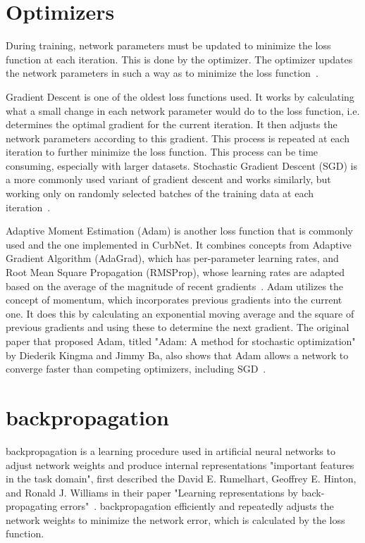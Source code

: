 \section{Optimizers}\label{section:background-optimizers}
During training, network parameters must be updated to minimize the loss function at each iteration.
This is done by the optimizer.
The optimizer updates the network parameters in such a way as to minimize the loss function~\cite{optimizer-intro}.

Gradient Descent is one of the oldest loss functions used.
It works by calculating what a small change in each network parameter would do to the loss function, i.e. determines the optimal gradient for the current iteration.
It then adjusts the network parameters according to this gradient.
This process is repeated at each iteration to further minimize the loss function.
This process can be time consuming, especially with larger datasets.
Stochastic Gradient Descent (SGD) is a more commonly used variant of gradient descent and works similarly, but working only on randomly selected batches of the training data at each iteration~\cite{optimizer-intro}.

Adaptive Moment Estimation (Adam) is another loss function that is commonly used and the one implemented in CurbNet.
It combines concepts from Adaptive Gradient Algorithm (AdaGrad), which has per-parameter learning rates, and Root Mean Square Propagation (RMSProp), whose learning rates are adapted based on the average of the magnitude of recent gradients~\cite{adam}.
Adam utilizes the concept of momentum, which incorporates previous gradients into the current one.
It does this by calculating an exponential moving average and the square of previous gradients and using these to determine the next gradient.
The original paper that proposed Adam, titled "Adam: A method for stochastic optimization" by Diederik Kingma and Jimmy Ba, also shows that Adam allows a network to converge faster than competing optimizers, including SGD~\cite{adam}.

\section{backpropagation}\label{section:background-backpropagation}
backpropagation is a learning procedure used in artificial neural networks to adjust network weights and produce internal representations "important features in the task domain", first described the David E. Rumelhart, Geoffrey E. Hinton, and Ronald J. Williams in their paper "Learning representations by back-propagating errors"~\cite{backprop}.
backpropagation efficiently and repeatedly adjusts the network weights to minimize the network error, which is calculated by the loss function.

